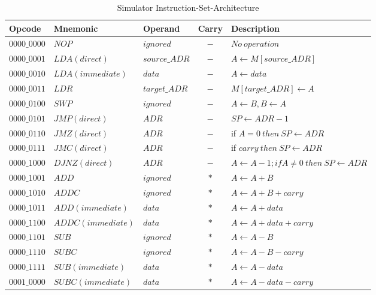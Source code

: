 \begin{table}[htbp]
    \centering
    \caption{Simulator Instruction-Set-Architecture}
    \label{tab:instruction_set}
    \small
    \begin{tabularx}{\textwidth}{l l l c X}
\toprule
\textbf{Opcode} & \textbf{Mnemonic} & \textbf{Operand} & \textbf{Carry} & \textbf{Description} \\
\midrule
$0000\_0000$ & $NOP$              & $ignored$  & $-$     & $No\ operation$ \\
$0000\_0001$ & $LDA (direct)$     & $source\_ADR$ & $-$     & $A \leftarrow M[source\_ADR]$ \\
$0000\_0010$ & $LDA (immediate)$  & $data$       & $-$     & $A \leftarrow data$ \\
$0000\_0011$ & $LDR$              & $target\_ADR$ & $-$     & $M[target\_ADR] \leftarrow A$ \\
$0000\_0100$ & $SWP$              & $ignored$  & $-$     & $A \leftarrow B, B \leftarrow A$ \\
$0000\_0101$ & $JMP  (direct)$    & $ADR$        & $-$     & $SP \leftarrow ADR - 1$ \\
$0000\_0110$ & $JMZ  (direct)$    & $ADR$        & $-$     & if $A = 0\ then\ SP \leftarrow ADR$ \\
$0000\_0111$ & $JMC  (direct)$    & $ADR$        & $-$     & if $carry\ then\ SP \leftarrow ADR$ \\
$0000\_1000$ & $DJNZ (direct)$    & $ADR$        & $-$     & ${A \leftarrow A - 1;} {if A \neq 0\ then\ SP \leftarrow ADR}$ \\
\midrule
$0000\_1001$ & $ADD$              & $ignored$  & $*$   & $A \leftarrow A + B$ \\
$0000\_1010$ & $ADDC$             & $ignored$  & $*$   & $A \leftarrow A + B + carry$ \\
$0000\_1011$ & $ADD (immediate)$  & $data$       & $*$   & $A \leftarrow A + data$ \\
$0000\_1100$ & $ADDC (immediate)$ & $data$       & $*$   & $A \leftarrow A + data + carry$ \\
$0000\_1101$ & $SUB$              & $ignored$  & $*$   & $A \leftarrow A - B$ \\
$0000\_1110$ & $SUBC$             & $ignored$  & $*$   & $A \leftarrow A - B - carry$ \\
$0000\_1111$ & $SUB (immediate)$  & $data $      & $*$   & $A \leftarrow A - data$ \\
$0001\_0000$ & $SUBC (immediate)$ & $data $      & $*$   & $A \leftarrow A - data - carry$ \\

\end{tabularx}
\end{table}
